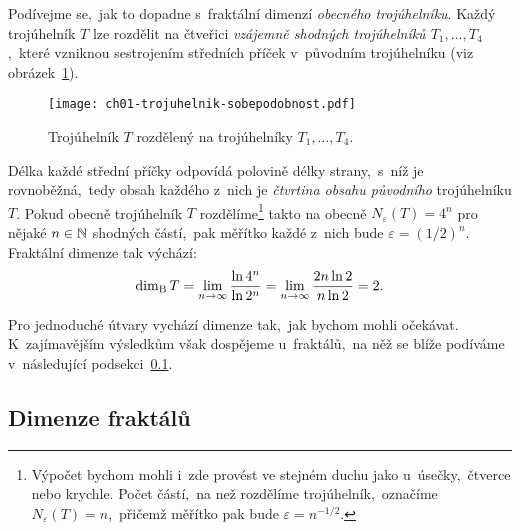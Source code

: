 \begin{example}\label{ex:fraktalni-dimenze-trojuhelnik}
    Podívejme se,~jak to dopadne s~fraktální dimenzí \emph{obecného trojúhelníku}. Každý trojúhelník $T$ lze rozdělit na čtveřici \emph{vzájemně shodných trojúhelníků $T_1,\dots,T_4$},~které vzniknou sestrojením středních příček v~původním trojúhelníku (viz obrázek~\ref{fig:trojuhelnik-sobepodobnost}).
    \begin{figure}[h]
        \centering
        \texttt{[image: ch01-trojuhelnik-sobepodobnost.pdf]}
        \caption{Trojúhelník $T$ rozdělený na trojúhelníky $T_1,\dots,T_4$.}
        \label{fig:trojuhelnik-sobepodobnost}
    \end{figure}
    Délka každé střední příčky odpovídá polovině délky strany,~s~níž je rovnoběžná,~tedy obsah každého z~nich je \emph{čtvrtina obsahu původního} trojúhelníku $T$. Pokud obecně trojúhelník $T$ rozdělíme\footnote{Výpočet bychom mohli i~zde provést ve stejném duchu jako u~úsečky,~čtverce nebo krychle. Počet částí,~na než rozdělíme trojúhelník,~označíme $N_\varepsilon(T)=n$,~přičemž měřítko pak bude $\varepsilon=n^{-1/2}$.} takto na obecně $N_\varepsilon(T)=4^n$ pro nějaké $n\in\mathbb{N}$ shodných částí,~pak měřítko každé z~nich bude $\varepsilon=(1/2)^n$. Fraktální dimenze tak výchází:
    \[\operatorname{dim_B}{T}=\lim_{n\to\infty}{\dfrac{\ln{4^n}}{\ln{2^n}}}=\lim_{n\to\infty}{\dfrac{2n\ln{2}}{n\ln{2}}}=2.\]
\end{example}
Pro jednoduché útvary vychází dimenze tak,~jak bychom mohli očekávat. K~zajímavějším výsledkům však dospějeme u~fraktálů,~na něž se blíže podíváme v~následující podsekci~\ref{subsec:dimenze-fraktalu}.

\subsection{Dimenze fraktálů}\label{subsec:dimenze-fraktalu}

